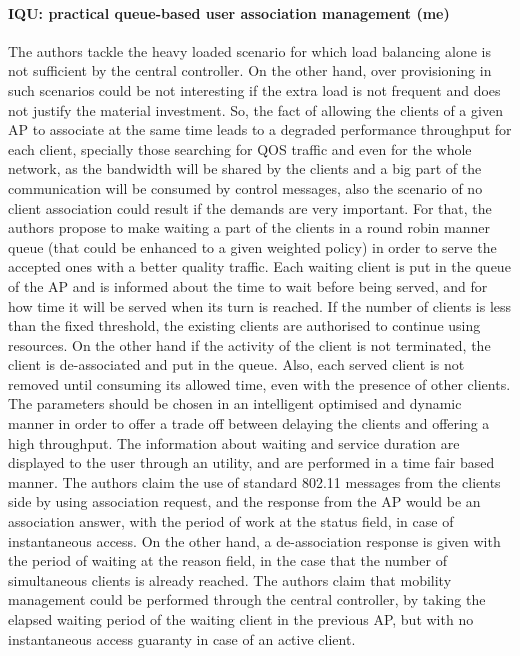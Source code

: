 \documentclass[journal,transmag]{IEEEtran}
\begin{document}
\paragraph{IQU: practical queue-based user association management \cite{06practical_queue_based_AP_association} (me)} 

The authors tackle the heavy loaded scenario for which load balancing alone is not sufficient by the central controller. On the other hand, over provisioning in such scenarios could be not interesting if the extra load is not frequent and does not justify the material investment. So, the fact of allowing the clients of a given AP to associate at the same time leads to a degraded performance throughput for each client, specially those searching for QOS traffic and even for the whole network, as the bandwidth will be shared by the clients and a big part of the communication will be consumed by control messages, also the scenario of no client association could result if the demands are very important. For that, the authors propose to make waiting a part of the clients in a round robin manner queue (that could be enhanced to a given weighted policy) in order to serve the accepted ones with a better quality traffic. Each waiting client is put in the queue of the AP and is informed about the time to wait before being served, and for how time it will be served when its turn is reached. If the number of clients is less than the fixed threshold, the existing clients are authorised to continue using resources. On the other hand if the activity of the client is not terminated, the client is de-associated and put in the queue. Also, each served client is not removed until consuming its allowed time, even with the presence of other clients. The parameters should be chosen in an intelligent optimised and dynamic manner in order to offer a trade off between delaying the clients and offering a high throughput. The information about waiting and service duration are displayed to the user through an utility, and are performed in a time fair based manner. The authors claim the use of standard 802.11 messages from the clients side by using association request, and the response from the AP would be an association answer, with the period of work at the status field, in case of instantaneous access. On the other hand, a de-association response is given with the period of waiting at the reason field, in the case that the number of simultaneous clients is already reached. The authors claim that mobility management could be performed through the central controller, by taking the elapsed waiting period of the waiting client in the previous AP, but with no instantaneous access guaranty in case of an active client.\\    
\end{document}
